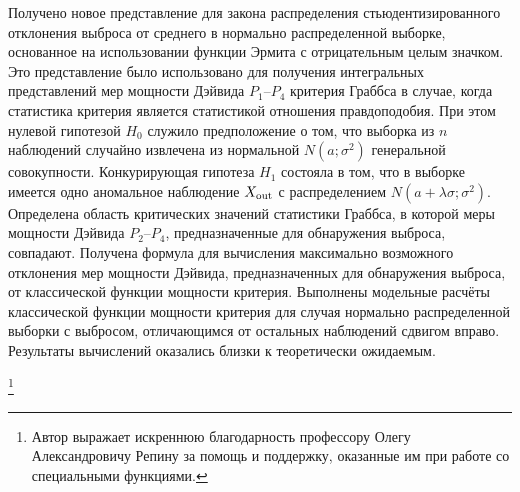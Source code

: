 Получено новое представление для закона  распределения  стьюдентизированного отклонения выброса от среднего в нормально распределенной выборке, основанное на использовании функции Эрмита с отрицательным целым значком.
Это представление было использовано для получения  
интегральных представлений мер мощности Дэйвида $P_1$--$P_4$ критерия Граббса в случае, когда статистика критерия является статистикой отношения правдоподобия.
При  этом нулевой гипотезой  $H_0$ служило
предположение о том, что выборка из  $n$ наблюдений случайно
извлечена из нормальной $N(a;\sigma^2)$ генеральной совокупности.
Конкурирующая гипотеза $H_1$ состояла в
том, что в выборке имеется одно аномальное наблюдение $X_{\rm out}$ с распределением $N(a+\lambda\sigma;\sigma^2)$.
Определена область критических значений статистики Граббса, в которой  меры мощности Дэйвида $P_2$--$P_4$,
 предназначенные для обнаружения выброса, совпадают.
 Получена формула для вычисления максимально возможного отклонения мер мощности Дэйвида, 
 предназначенных для обнаружения выброса, от классической функции мощности критерия. Выполнены модельные расчёты классической функции мощности критерия для случая нормально распределенной выборки с выбросом, отличающимся от остальных наблюдений сдвигом вправо. Результаты вычислений оказались  близки к теоретически ожидаемым.

\thanks{Автор выражает искреннюю благодарность профессору Олегу Александровичу Репину
 за помощь и поддержку, оказанные им  при работе со специальными  функциями.}


